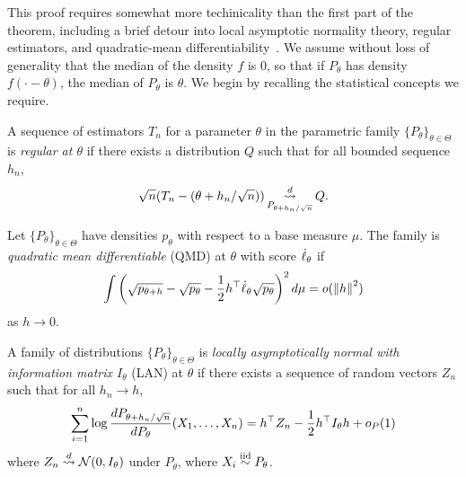 This proof requires somewhat more techinicality than the first part of the
theorem, including a brief detour into local asymptotic normality theory,
regular estimators, and quadratic-mean
differentiability~\cite[cf.]{VanDerVaart98}.
We assume without loss of generality that the median of the density
$f$ is 0, so that if $P_\theta$ has density $f(\cdot - \theta)$, the
median of $P_\theta$ is $\theta$.
We begin by recalling the statistical concepts we require.
\begin{definition}
  \label{definition:regular-estimator}
  A sequence of estimators $T_n$ for a parameter $\theta$ in the parametric
  family $\{P_\theta\}_{\theta \in \Theta}$ is \emph{regular at $\theta$} if
  there exists a distribution $Q$ such that for all bounded sequence
  $h_n$,
  \begin{equation*}
    \sqrt{n}(T_n - (\theta + h_n / \sqrt{n}))
    \mathop{\stackrel{d}{\rightsquigarrow}}_{P_{\theta + h_n/\sqrt{n}}}
    Q.
  \end{equation*}
\end{definition}
\begin{definition}
  \label{definition:qmd}
  Let $\{P_\theta\}_{\theta \in \Theta}$ have densities $p_\theta$
  with respect to a base measure $\mu$. The family
  is \emph{quadratic mean differentiable} (QMD) at
  $\theta$ with score $\dot{\ell}_\theta$ if
  \begin{equation}
    \label{eqn:qmd}
    \int \left(\sqrt{p_{\theta + h}} - \sqrt{p_\theta}
    - \frac{1}{2} h^\top \dot{\ell}_\theta\sqrt{p_\theta} \right)^2 d\mu
    = o(\left\|{h}\right\|^2)
  \end{equation}
  as $h \to 0$.
\end{definition}
\begin{definition}
  \label{definition:lan}
  A family of distributions $\{P_\theta\}_{\theta \in \Theta}$ is
  \emph{locally asymptotically normal with information matrix $I_\theta$} (LAN)
  at
  $\theta$ if there exists a sequence of random vectors $Z_n$ such that for
  all $h_n \to h$,
  \begin{equation*}
    \sum_{i = 1}^n \log \frac{dP_{\theta + h_n/\sqrt{n}}}{dP_\theta}
    (X_1, \ldots, X_n)
    = h^\top Z_n - \frac{1}{2} h^\top I_\theta h + o_P(1)
  \end{equation*}
  where $Z_n \stackrel{d}{\rightsquigarrow} \mathcal{N}(0, I_\theta)$ under $P_\theta$, where
  $X_i \stackrel{\textup{iid}}{\sim} P_\theta$.
\end{definition}

